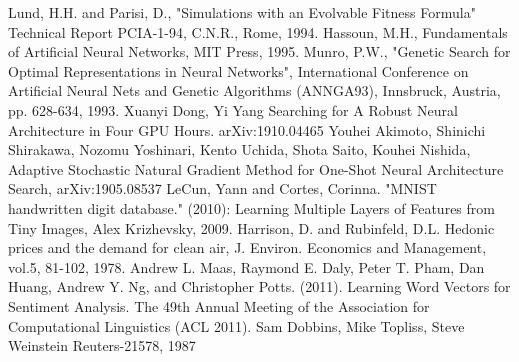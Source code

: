 \documentclass[conference]{IEEEtran}
\begin{document}
\begin{thebibliography}{00}
 Lund, H.H. and Parisi, D., "Simulations with an Evolvable Fitness Formula" Technical Report PCIA-1-94, C.N.R., Rome, 1994.
 Hassoun, M.H., Fundamentals of Artificial Neural Networks, MIT Press, 1995.
 Munro, P.W., "Genetic Search for Optimal Representations in Neural Networks", International Conference on Artificial Neural Nets and Genetic Algorithms (ANNGA93), Innsbruck, Austria, pp. 628-634, 1993.
 Xuanyi Dong, Yi Yang Searching for A Robust Neural Architecture in Four GPU Hours. arXiv:1910.04465
 Youhei Akimoto, Shinichi Shirakawa, Nozomu Yoshinari, Kento Uchida, Shota Saito, Kouhei Nishida, Adaptive Stochastic Natural Gradient Method for One-Shot Neural Architecture Search, arXiv:1905.08537
 LeCun, Yann and Cortes, Corinna. "MNIST handwritten digit database." (2010): 
 Learning Multiple Layers of Features from Tiny Images, Alex Krizhevsky, 2009.
 Harrison, D. and Rubinfeld, D.L. Hedonic prices and the demand for clean air, J. Environ. Economics and Management, vol.5, 81-102, 1978. 
 Andrew L. Maas, Raymond E. Daly, Peter T. Pham, Dan Huang, Andrew Y. Ng, and Christopher Potts. (2011). Learning Word Vectors for Sentiment Analysis. The 49th Annual Meeting of the Association for Computational Linguistics (ACL 2011).
 Sam Dobbins, Mike Topliss, Steve Weinstein Reuters-21578, 1987
\end{thebibliography}
\end{document}
